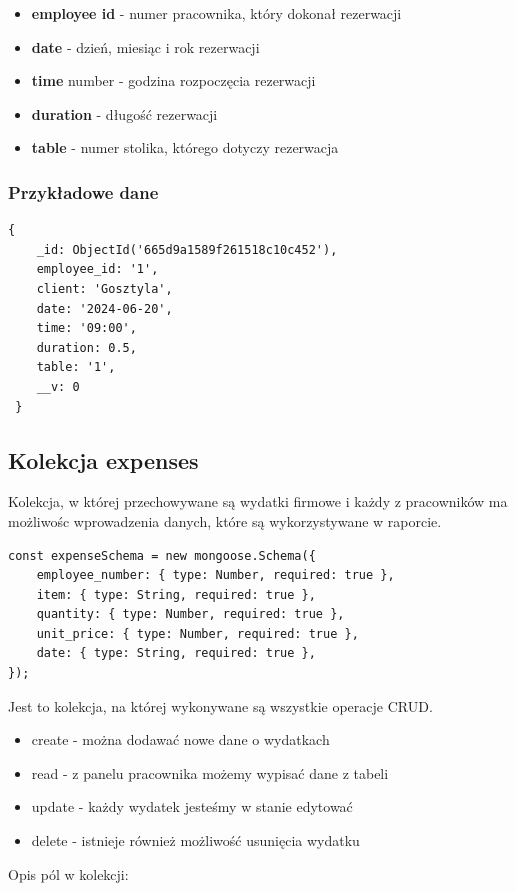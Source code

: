 \documentclass[12pt]{article}
\begin{document}
\begin{itemize}
	\item \textbf{employee id} - numer pracownika, który dokonał rezerwacji
	\item \textbf{date} - dzień, miesiąc i rok rezerwacji
	\item \textbf{time} number - godzina rozpoczęcia rezerwacji
	\item \textbf{duration} - długość rezerwacji
	\item \textbf{table} - numer stolika, którego dotyczy rezerwacja
\end{itemize}

\subsubsection{Przykładowe dane}
\begin{lstlisting}[]
 {
	_id: ObjectId('665d9a1589f261518c10c452'),
    employee_id: '1',
    client: 'Gosztyla',
    date: '2024-06-20',
    time: '09:00',
    duration: 0.5,
    table: '1',
    __v: 0
 }
\end{lstlisting}

\newpage
\begin{samepage}
\subsection{Kolekcja expenses}
Kolekcja, w której przechowywane są wydatki firmowe i każdy z pracowników ma możliwośc wprowadzenia danych, które są wykorzystywane w raporcie.
\begin{lstlisting}[caption={Expenses}]
const expenseSchema = new mongoose.Schema({
	employee_number: { type: Number, required: true },
	item: { type: String, required: true },
	quantity: { type: Number, required: true },
	unit_price: { type: Number, required: true },
	date: { type: String, required: true },
});
\end{lstlisting}
Jest to kolekcja, na której wykonywane są wszystkie operacje CRUD.
\begin{itemize}
	\item create - można dodawać nowe dane o wydatkach 
	\item read - z panelu pracownika możemy wypisać dane z tabeli
	\item update - każdy wydatek jesteśmy w stanie edytować
	\item delete - istnieje również możliwość usunięcia wydatku
\end{itemize}
\end{samepage}
Opis pól w kolekcji:
\end{document}
